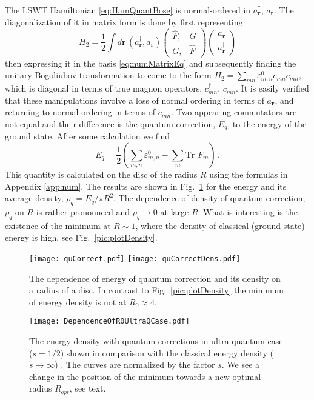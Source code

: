 \documentclass[aps,prb,twocolumn,superscriptaddress,nobalancelastpage]{revtex4-1}
\begin{document}
The LSWT Hamiltonian \eqref{eq:HamQuantBose} is normal-ordered in 
$a_{\mathbf{r}}^\dag$, $ a_{\mathbf{r}}$. The diagonalization of it in matrix form is done by first 
representing 
\[  H_{2} =   \frac 12 \int d\mathbf{r}  \, 
  ( a_{\mathbf{r}}^\dag ,    a_{\mathbf{r}} ) 
\begin{pmatrix}
\hat F  ,&   G  \\ 
 G  , & \hat F 
\end{pmatrix}
 \begin{pmatrix}
  a_{\mathbf{r}} \\   a_{\mathbf{r}} ^\dag 
 \end{pmatrix}
 \] 
then expressing it in the basis \eqref{eq:numMatrixEq} and subsequently finding the unitary Bogoliubov transformation to come to the form $H_{2} = \sum _{mn}  \varepsilon^0_{m,n} c_{mn}^{\dag}  c_{mn}$, which is diagonal in terms of true magnon  operators, $ c_{mn}^{\dag} $, $ c_{mn} $.  It is easily verified that these manipulations involve a loss of normal ordering in terms of $a_{\mathbf{r}}$, and returning to normal ordering in terms of  $ c_{mn}$. Two appearing commutators are not equal and their difference is the quantum correction, $E_{q}$, to the energy of the ground state. 
After some calculation we find
\begin{equation}
E_{q} = \frac{1}{2}\left( \sum_{m,n} \varepsilon^0_{m,n} - \sum_m \mbox{Tr }  F_m  \right) \,.
\label{eq:Q_correction}
\end{equation}
This quantity is calculated on the disc of the radius $R$ using the formulas in Appendix \ref{app:num}. The results are shown in  Fig.\  \ref{pic:qCorEn} for the energy and its average density, $\rho_{q} = E_{q}/\pi R^{2}$. 
The dependence of density of quantum correction, $\rho_{q}$ on $R$ is rather pronounced and    $\rho_{q}\to 0$  at large $R$. What is interesting is the existence of the minimum at   $R \sim 1$,  where the density of classical (ground state) energy is high, see Fig.\ \ref{pic:plotDensity}. 


\begin{figure}[t]
\texttt{[image: quCorrect.pdf]}
\texttt{[image: quCorrectDens.pdf]}
\caption{The dependence of energy of quantum correction and its density on a radius of a disc. In contrast to Fig.\  \ref{pic:plotDensity} the minimum of energy density  is not at $R_0 \approx 4$.}
\label{pic:qCorEn}
\end{figure}


\begin{figure}[t]
\texttt{[image: DependenceOfR0UltraQCase.pdf]}
\caption{The energy density with quantum corrections in ultra-quantum case ($s=1/2$) shown in comparison with the classical energy density ($s\to \infty$) . The curves are normalized by the factor $s$.  We see a change in the position of  the minimum towards a  new optimal radius $R_{opt}$, see text.}
\label{pic:ultraQuantCase}
\end{figure}
\end{document}
